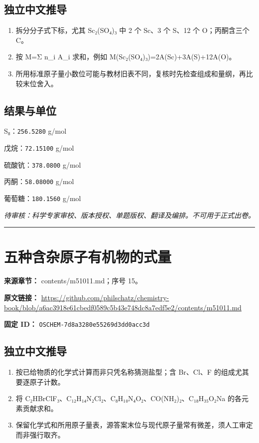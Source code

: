 \documentclass[UTF8,11pt,oneside,openany,fontset=none]{ctexbook}
\begin{document}
\subsection*{独立中文推导}
\begin{enumerate}
\item 拆分分子式下标，尤其 Sc₂(SO₄)₃ 中 2 个 Sc、3 个 S、12 个 O；丙酮含三个 C。
\item 按 M=Σ n\_i A\_i 求和，例如 M(Sc₂(SO₄)₃)=2A(Sc)+3A(S)+12A(O)。
\item 所用标准原子量小数位可能与教材旧表不同，复核时先检查组成和量纲，再比较末位舍入。
\end{enumerate}
\subsection*{结果与单位}
\noindent S₈：\texttt{256.5280} g/mol\par
\noindent 戊烷：\texttt{72.15100} g/mol\par
\noindent 硫酸钪：\texttt{378.0800} g/mol\par
\noindent 丙酮：\texttt{58.08000} g/mol\par
\noindent 葡萄糖：\texttt{180.1560} g/mol\par
\noindent\textit{待审核：科学专家审校、版本授权、单题版权、翻译及编排。不可用于正式出卷。}
\medskip\hrule\medskip
\section{五种含杂原子有机物的式量}
\noindent\textbf{来源章节：} contents/m51011.md；序号 15。\par
\noindent\textbf{原文链接：} \url{https://github.com/philschatz/chemistry-book/blob/a6ac3918e61cbedf0589c5b43e748dc8a7edf5e2/contents/m51011.md}\par
\noindent\textbf{固定 ID：} \texttt{OSCHEM-7d8a3280e55269d3dd0acc3d}\par
\subsection*{独立中文推导}
\begin{enumerate}
\item 按已给物质的化学式计算而非只凭名称猜测盐型；含 Br、Cl、F 的组成尤其要逐原子计数。
\item 将 C₂HBrClF₃、C₁₂H₁₄N₂Cl₂、C₈H₁₀N₄O₂、CO(NH₂)₂、C₁₈H₃₅O₂Na 的各元素贡献求和。
\item 保留化学式和所用原子量表，源答案末位与现代原子量常有微差，须人工审定而非强行取齐。
\end{enumerate}
\end{document}
